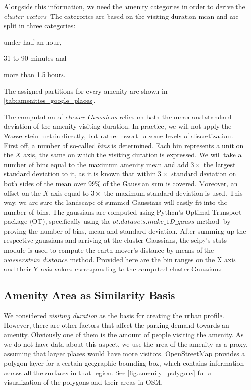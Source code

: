 \documentclass{ws-ijait}
\begin{document}
		Alongside this information, we need the amenity categories in order to derive the \textit{cluster vectors}.
		The categories are based on the visiting duration mean and are split in three categories: 
		\begin{romanlist}
			\item under half an hour,
			\item 31 to 90 minutes and
			\item more than 1.5 hours. 
		\end{romanlist}
		The assigned partitions for every amenity are shown in \cref{tab:amenities_google_places}. 
		
		The computation of \textit{cluster Gaussians} relies on both the mean and standard deviation of the amenity visiting duration. In practice, we will not apply the Wasserstein metric directly, but rather resort to some levels of discretization. First off, a number of so-called \textit{bins} is determined. Each bin represents a unit on the $X$ axis, the same on which the visiting duration is expressed. We will take a number of bins equal to the maximum amenity mean and add $3\times$ the largest standard deviation to it, as it is known that within $3\times$ standard deviation on both sides of the mean over 99\% of the Gaussian sum is covered. Moreover, an offset on the $X$-axis equal to $3\times$ the maximum standard deviation is used. This way, we are sure the landscape of summed Gaussians will easily fit into the number of bins. The gaussians are computed using Python's Optimal Transport package (OT), specifically using the $ot.datasets.make\_1D\_gauss$ method, by proving the number of bins, mean and standard deviation. After summing up the respective gaussians and arriving at the cluster Gaussians, the scipy's stats module is used to compute the earth mover's distance by means of the $wasserstein\_distance$ method. Provided here are the bin ranges on the X axis and their Y axis values corresponding to the computed cluster Gaussians.
	
		\subsection{Amenity Area as Similarity Basis}
		\label{experimental_setup:amenity_area}
		We considered \textit{visiting duration} as the basis for creating the urban profile. However, there are other factors that affect the parking demand towards an amenity.
		Obviously one of them is the amount of people visiting the amenity.
		As we do not have data about this aspect, we use the area of the amenity as a proxy, assuming that larger places would have more visitors.
		OpenStreetMap provides a polygon layer for a certain geographic bounding box, which contains information across all the surfaces in that region. See \cref{fig:amenity_polygons} for a visualization of the polygons and their areas in OSM. 
		
\end{document}
